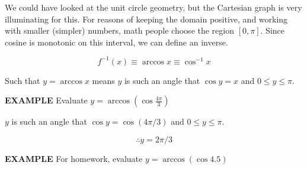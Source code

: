 \documentclass{article}
\begin{document}
We could have looked at the unit circle geometry, but the Cartesian graph is very illuminating for this. For reasons of keeping the domain positive, and working with smaller (simpler) numbers, math people choose the region $[0,\pi]$. Since cosine is monotonic on this interval, we can define an inverse.

\[f^{-1}(x)\equiv\arccos x\equiv\cos^{-1}x\]

Such that $y=\arccos x$ means $y$ is such an angle that $\cos y=x$ and $0\leq y\leq\pi$.

\vspace{10pt}

{\bf{}EXAMPLE} Evaluate $y=\arccos(\cos\frac{4\pi}{3})$

\vspace{10pt}

$y$ is such an angle that $\cos y=\cos(4\pi/3)$ and $0\leq y\leq\pi$.

\begin{center}
\end{center}

\[\therefore y=2\pi/3\]

{\bf{}EXAMPLE} For homework, evaluate $y=\arccos(\cos4.5)$
\end{document}
